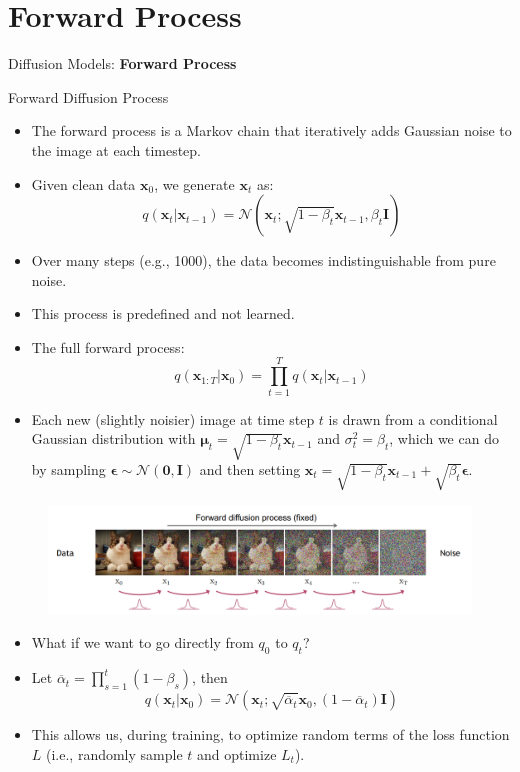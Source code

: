 \section{Forward Process}
\begin{frame}{}
    \LARGE Diffusion Models: \textbf{Forward Process}
\end{frame}

\begin{frame}[allowframebreaks]{Forward Diffusion Process}
    \begin{itemize}
        \item The forward process is a Markov chain that iteratively adds Gaussian noise to the image at each timestep.
        \item Given clean data $\mathbf{x}_0$, we generate $\mathbf{x}_t$ as:
        $$q(\mathbf{x}_t|\mathbf{x}_{t-1}) = \mathcal{N}(\mathbf{x}_t;\sqrt{1-\beta_t}\mathbf{x}_{t-1}, \beta_t\mathbf{I})$$
        \item Over many steps (e.g., 1000), the data becomes indistinguishable from pure noise.
    \framebreak
        \item This process is predefined and not learned.
        \item The full forward process:
        $$q(\mathbf{x}_{1:T}|\mathbf{x}_{0}) = \prod^{T}_{t=1}q(\mathbf{x}_t|\mathbf{x}_{t-1})$$
        \item Each new (slightly noisier) image at time step $t$ is drawn from a conditional Gaussian distribution with $\mathbf{\mu}_t = \sqrt{1 - \beta_t} \mathbf{x}_{t-1}$ and $\sigma^2_t = \beta_t$, which we can do by sampling $\mathbf{\epsilon} \sim \mathcal{N}(\mathbf{0}, \mathbf{I})$ and then setting $\mathbf{x}_t = \sqrt{1 - \beta_t} \mathbf{x}_{t-1} +  \sqrt{\beta_t} \mathbf{\epsilon}$.
    \end{itemize}
    \framebreak
    \begin{figure}
        \centering
        \includegraphics[height=0.7\textheight, width=\textwidth, keepaspectratio]{images/diffusion/diff_2.png}
    \end{figure}
    \begin{itemize}
        \item What if we want to go directly from $q_0$ to $q_t$?
        \item Let $\overline{\alpha}_t = \prod^t_{s=1}(1-\beta_s)$, then
        $$q(\mathbf{x}_t | \mathbf{x}_0) = \mathcal{N}(\mathbf{x}_t; \sqrt{\overline{\alpha}_t} \mathbf{x}_0 , (1 - \overline{\alpha}_t) \mathbf{I})$$
        \item This allows us, during training, to optimize random terms of the loss function $L$ (i.e., randomly sample $t$ and optimize $L_t$).
    \end{itemize}
\end{frame}

